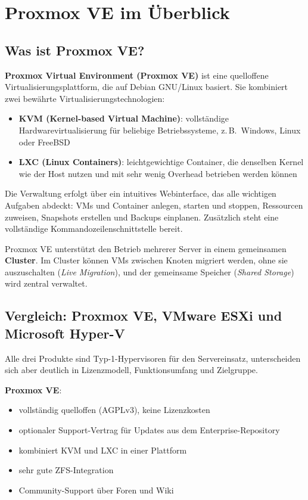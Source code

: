 \documentclass[11pt, oneside, numbers=noenddot]{scrbook}
\begin{document}
\chapter{Proxmox VE im Überblick}

\section{Was ist Proxmox VE?}
\textbf{Proxmox Virtual Environment (Proxmox VE)} ist eine quelloffene Virtualisierungsplattform, die auf Debian GNU/Linux basiert. Sie kombiniert zwei bewährte Virtualisierungstechnologien:

\begin{itemize}
  \item \textbf{KVM (Kernel-based Virtual Machine)}: vollständige Hardwarevirtualisierung für beliebige Betriebssysteme, z.\,B.\ Windows, Linux oder FreeBSD
  \item \textbf{LXC (Linux Containers)}: leichtgewichtige Container, die denselben Kernel wie der Host nutzen und mit sehr wenig Overhead betrieben werden können
\end{itemize}

Die Verwaltung erfolgt über ein intuitives Webinterface, das alle wichtigen Aufgaben abdeckt: VMs und Container anlegen, starten und stoppen, Ressourcen zuweisen, Snapshots erstellen und Backups einplanen. Zusätzlich steht eine vollständige Kommandozeilenschnittstelle bereit.

Proxmox VE unterstützt den Betrieb mehrerer Server in einem gemeinsamen \textbf{Cluster}. Im Cluster können VMs zwischen Knoten migriert werden, ohne sie auszuschalten (\textit{Live Migration}), und der gemeinsame Speicher (\textit{Shared Storage}) wird zentral verwaltet.

\section{Vergleich: Proxmox VE, VMware ESXi und Microsoft Hyper-V}
Alle drei Produkte sind Typ-1-Hypervisoren für den Servereinsatz, unterscheiden sich aber deutlich in Lizenzmodell, Funktionsumfang und Zielgruppe.

\textbf{Proxmox VE}:
\begin{itemize}
  \item vollständig quelloffen (AGPLv3), keine Lizenzkosten
  \item optionaler Support-Vertrag für Updates aus dem Enterprise-Repository
  \item kombiniert KVM und LXC in einer Plattform
  \item sehr gute ZFS-Integration
  \item Community-Support über Foren und Wiki
\end{itemize}
\end{document}
